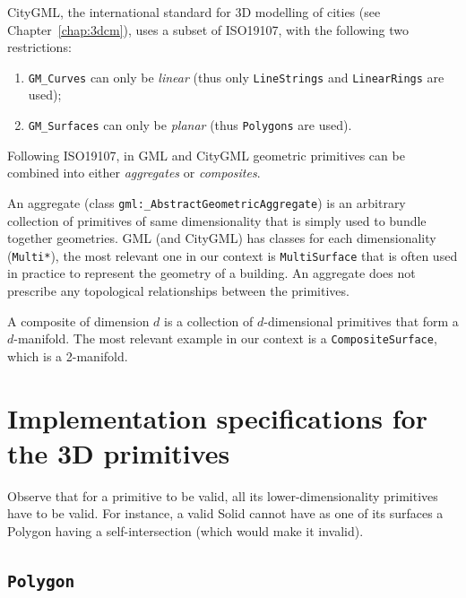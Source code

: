 CityGML, the international standard for 3D modelling of cities (see Chapter~\ref{chap:3dcm}), uses a subset of ISO19107, with the following two restrictions: 
\begin{enumerate}
  \item \texttt{GM\_Curves} can only be \emph{linear} (thus only \texttt{LineStrings} and \texttt{Li\-near\-Rings} are used); 
  \item \texttt{GM\_Surfaces} can only be \emph{planar} (thus \texttt{Polygons} are used).
\end{enumerate}

%

Following ISO19107, in GML and CityGML geometric primitives can be combined into either \emph{aggregates} or \emph{composites}.

An aggregate (class \texttt{gml:\_AbstractGeometricAggregate}) is an arbitrary collection of primitives of same dimensionality that is simply used to bundle together geometries.
GML (and CityGML) has classes for each dimensionality (\texttt{Multi*}), the most relevant one in our context is \texttt{MultiSurface} that is often used in practice to represent the geometry of a building.
An aggregate does not prescribe any topological relationships between the primitives.

A composite of dimension $d$ is a collection of $d$-dimensional primitives that form a $d$-manifold. 
The most relevant example in our context is a \texttt{CompositeSurface}, which is a 2-manifold.



%
\section[Implementation specifications]{Implementation specifications for the 3D primitives}%
\label{sec:isovalidity}


Observe that for a primitive to be valid, all its lower-dimensionality primitives have to be valid.
For instance, a valid Solid cannot have as one of its surfaces a Polygon having a self-intersection (which would make it invalid).


\subsection{\texttt{Polygon}}

